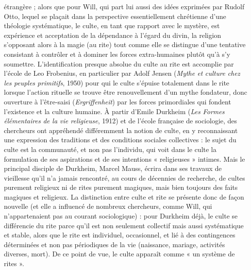 étrangère ; alors que pour Will, qui part
lui aussi des idées exprimées par Rudolf
Otto, lequel se plaçait dans la perspective
essentiellement chrétienne d’une théologie
systématique, le culte, en tant que rapport
avec le mystère, est expérience et
acceptation de la dépendance à l’égard du
divin, la religion s’opposant alors à la
magie (au rite) tout comme elle se distingue
d’une tentative consistant à contrôler
et à dominer les forces extra-humaines
plutôt qu’à s’y soumettre. L'identification
presque absolue du culte au rite est
accomplie par l’école de Leo Frobenius,
en particulier par Adolf Jensen ({\it Mythe et
culture chez les peuples primitifs}, 1950)
pour qui le culte s’épuise totalement dans
le rite lorsque l’action rituelle se trouve
être renouvellement d’un mythe fondateur,
donc ouverture à l’être-saisi ({\it Ergriffenheit})
par les forces primordiales qui
fondent l’existence et la culture humaine.
À partir d'Emile Durkheim ({\it Les Formes
élémentaires de la vie religieuse}, 1912) et
de l’école française de sociologie, des
chercheurs ont appréhendé différemment
la notion de culte, en y reconnaissant une
expression des traditions et des conditions
sociales collectives : le sujet du culte est
la communauté, et non pas l’individu, qui
voit dans le culte la formulation de ses
aspirations et de ses intentions « religieuses »
intimes. Mais le principal disciple de
Durkheim, Marcel Mauss, écrira dans ses
travaux de vieillesse qu’il n’a jamais rencontré,
au cours de décennies de
recherche, de cultes purement religieux ni
de rites purement magiques, mais bien
toujours des faits magiques et religieux.
La distinction entre culte et rite se présente
donc de façon nouvelle (et elle a
influencé de nombreux chercheurs,
comme Will, qui n’appartenaient pas au
courant sociologique) : pour Durkheim
déjà, le culte se différencie du rite parce
%
qu’il est non seulement collectif mais
aussi systématique et stable, alors que le
rite est individuel, occasionnel, et lié à des
contingences déterminées et non pas
périodiques de la vie (naissance, mariage,
activités diverses, mort). De ce point de
vue, le culte apparaît comme « un système
de rites ».


